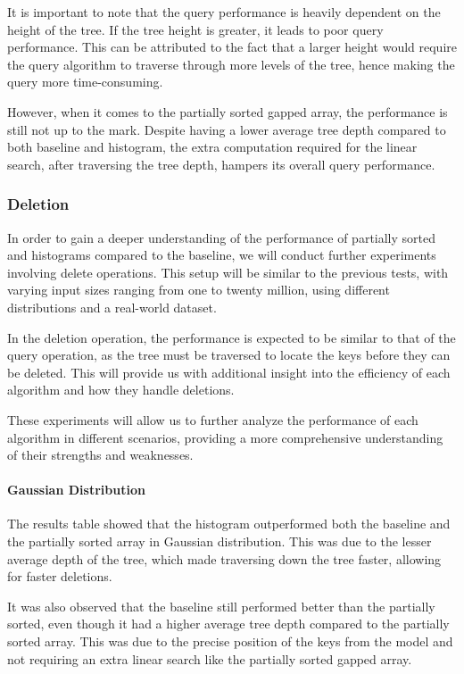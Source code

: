 \documentclass[11pt,a4paper]{article}
\begin{document}
It is important to note that the query performance is heavily dependent on the height of the tree. If the tree height is greater, it leads to poor query performance. This can be attributed to the fact that a larger height would require the query algorithm to traverse through more levels of the tree, hence making the query more time-consuming.

However, when it comes to the partially sorted gapped array, the performance is still not up to the mark. Despite having a lower average tree depth compared to both baseline and histogram, the extra computation required for the linear search, after traversing the tree depth, hampers its overall query performance.


\subsubsection{Deletion}
In order to gain a deeper understanding of the performance of partially sorted and histograms compared to the baseline, we will conduct further experiments involving delete operations. This setup will be similar to the previous tests, with varying input sizes ranging from one to twenty million, using different distributions and a real-world dataset.

In the deletion operation, the performance is expected to be similar to that of the query operation, as the tree must be traversed to locate the keys before they can be deleted. This will provide us with additional insight into the efficiency of each algorithm and how they handle deletions.

These experiments will allow us to further analyze the performance of each algorithm in different scenarios, providing a more comprehensive understanding of their strengths and weaknesses.

\paragraph{Gaussian Distribution}
The results table showed that the histogram outperformed both the baseline and the partially sorted array in Gaussian distribution. This was due to the lesser average depth of the tree, which made traversing down the tree faster, allowing for faster deletions.

It was also observed that the baseline still performed better than the partially sorted, even though it had a higher average tree depth compared to the partially sorted array. This was due to the precise position of the keys from the model and not requiring an extra linear search like the partially sorted gapped array. 
\end{document}
